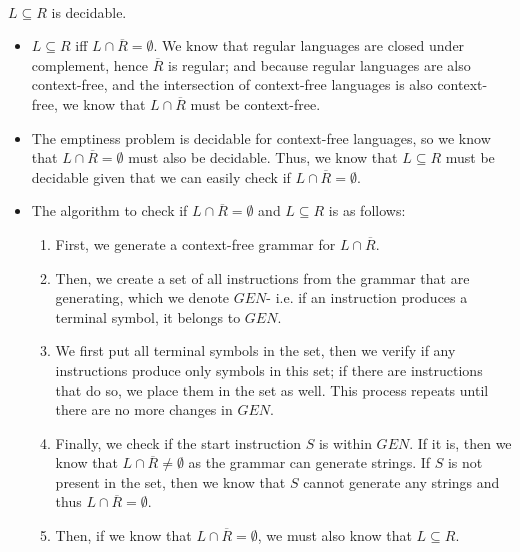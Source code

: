 \documentclass{article}
\begin{document}
\\\noindent \(L \subseteq R\) is decidable.
\begin{itemize}
    \item \(L \subseteq R\) iff \(L \cap \overline{R} = \emptyset\). We know that regular languages are closed under complement, hence \(\overline{R}\) is regular; and because regular languages are also context-free, and the intersection of context-free languages is also context-free, we know that \(L \cap \overline{R}\) must be context-free.
    \item The emptiness problem is decidable for context-free languages, so we know that \(L \cap \overline{R} = \emptyset\) must also be decidable. Thus, we know that \(L \subseteq R\) must be decidable given that we can easily check if \(L \cap \overline{R} = \emptyset\).
    \item The algorithm to check if \(L \cap \overline{R} = \emptyset\) and \(L \subseteq R\) is as follows: 
        \begin{enumerate}
            \item First, we generate a context-free grammar for \(L \cap \overline{R}\). 
            \item Then, we create a set of all instructions from the grammar that are generating, which we denote \(GEN\)- i.e. if an instruction produces a terminal symbol, it belongs to \(GEN\). 
            \item We first put all terminal symbols in the set, then we verify if any instructions produce only symbols in this set; if there are instructions that do so, we place them in the set as well. This process repeats until there are no more changes in \(GEN\).
            \item Finally, we check if the start instruction \(S\) is within \(GEN\). If it is, then we know that \(L \cap \overline{R} \neq \emptyset\) as the grammar can generate strings. If \(S\) is not present in the set, then we know that \(S\) cannot generate any strings and thus \(L \cap \overline{R} = \emptyset\).
            \item Then, if we know that \(L \cap \overline{R} = \emptyset\), we must also know that \(L \subseteq R\).
        \end{enumerate}
\end{itemize}
\\
\\

\newpage
\end{document}
